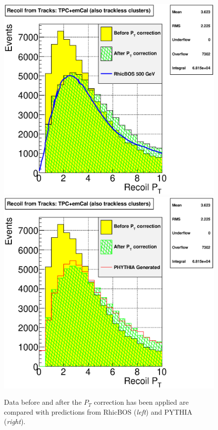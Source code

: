 \documentclass[12pt]{article}
\begin{document}
\begin{figure}[htbp]
\begin{center}
\includegraphics[scale=0.4]{images/plot_PtCorr}
\includegraphics[scale=0.4]{images/plot_PtCorr2}
\end{center}
\caption{Data before and after the $P_{T}$ correction has been applied are compared with predictions from RhicBOS ({\it left}) and PYTHIA ({\it right}).}
\label{fig:plot_PtCorr} 
\end{figure}
\end{document}
